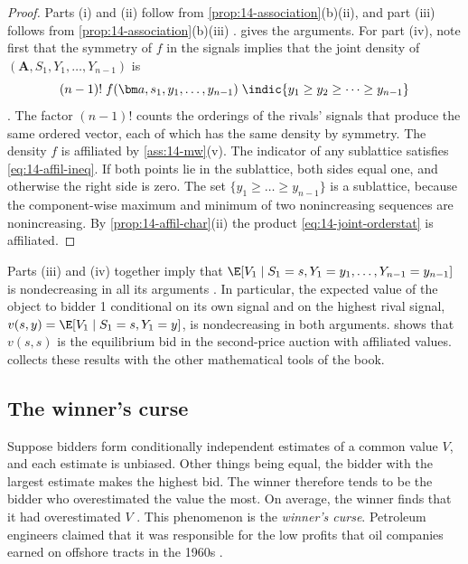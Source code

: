 \begin{proof}
Parts (i) and (ii) follow from \cref{prop:14-association}(b)(ii), and part (iii) follows from
\cref{prop:14-association}(b)(iii) \citep[p.~1119]{MilgromWeber1982}.  gives the
arguments. For part (iv), note first that the symmetry of $f$ in the signals implies that the joint density
of $(\bm A,S_1,Y_1,\dots,Y_{n-1})$ is
\begin{equation}\label{eq:14-joint-orderstat}
(n-1)!\;f(\bm a,s_1,y_1,\dots,y_{n-1})\;\indic\{y_1\ge y_2\ge\dots\ge y_{n-1}\}
\end{equation}
\citep[eq.~(4)]{MilgromWeber1982}. The factor $(n-1)!$ counts the orderings of the rivals' signals that
produce the same ordered vector, each of which has the same density by symmetry. The density $f$ is
affiliated by \cref{ass:14-mw}(v). The indicator of any sublattice satisfies \eqref{eq:14-affil-ineq}. If
both points lie in the sublattice, both sides equal one, and otherwise the right side is zero. The set
$\{y_1\ge\dots\ge y_{n-1}\}$ is a sublattice, because the component-wise maximum and minimum of two
nonincreasing sequences are nonincreasing. By \cref{prop:14-affil-char}(ii) the product
\eqref{eq:14-joint-orderstat} is affiliated.
\end{proof}

Parts (iii) and (iv) together imply that $\E[V_1\mid S_1=s,Y_1=y_1,\dots,Y_{n-1}=y_{n-1}]$ is nondecreasing in
all its arguments \citep[p.~1100]{MilgromWeber1982}. In particular, the expected value of the object to
bidder 1 conditional on its own signal and on the highest rival signal,
$v(s,y)=\E[V_1\mid S_1=s,Y_1=y]$, is nondecreasing in both arguments.  shows that $v(s,s)$
is the equilibrium bid in the second-price auction with affiliated values.  collects these
results with the other mathematical tools of the book.

\subsection{The winner's curse}\label{sec:14-winners-curse}

Suppose bidders form conditionally independent estimates of a common value $V$, and each estimate is
unbiased. Other things being equal, the bidder with the largest estimate makes the highest bid. The winner
therefore tends to be the bidder who overestimated the value the most. On average, the winner finds that it
had overestimated $V$ \citep[p.~1094]{MilgromWeber1982}. This phenomenon is the \emph{winner's curse}.
Petroleum engineers \citet{CapenClappCampbell1971} claimed that it was responsible for the low profits that
oil companies earned on offshore tracts in the 1960s \citep[p.~1094]{MilgromWeber1982}.

